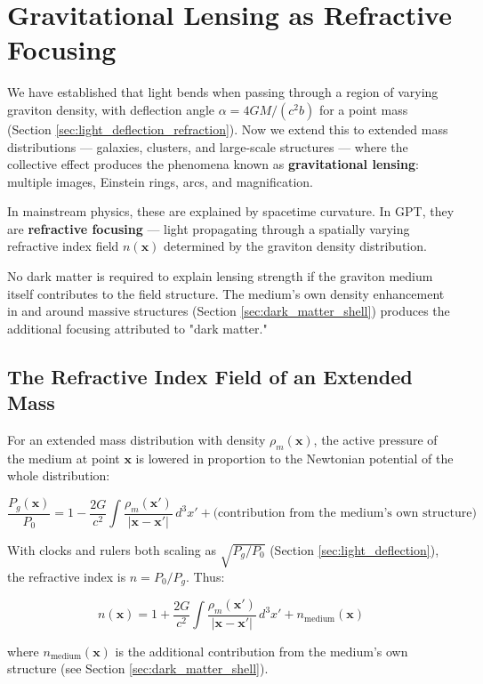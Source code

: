 \documentclass[12pt, a4paper]{article}
\begin{document}
\section{Gravitational Lensing as Refractive Focusing}
\label{sec:gravitational_lensing}

We have established that light bends when passing through a region of varying graviton density, with deflection angle \( \alpha = 4GM/(c^2 b) \) for a point mass (Section \ref{sec:light_deflection_refraction}). Now we extend this to extended mass distributions — galaxies, clusters, and large-scale structures — where the collective effect produces the phenomena known as \textbf{gravitational lensing}: multiple images, Einstein rings, arcs, and magnification.

In mainstream physics, these are explained by spacetime curvature. In GPT, they are \textbf{refractive focusing} — light propagating through a spatially varying refractive index field \( n(\mathbf{x}) \) determined by the graviton density distribution.

No dark matter is required to explain lensing strength if the graviton medium itself contributes to the field structure. The medium's own density enhancement in and around massive structures (Section \ref{sec:dark_matter_shell}) produces the additional focusing attributed to "dark matter."

\subsection{The Refractive Index Field of an Extended Mass}
\label{subsec:extended_refractive}

For an extended mass distribution with density \( \rho_m(\mathbf{x}) \), the active pressure of the medium at point \( \mathbf{x} \) is lowered in proportion to the Newtonian potential of the whole distribution:

\[
\frac{P_g(\mathbf{x})}{P_0} = 1 - \frac{2G}{c^2} \int \frac{\rho_m(\mathbf{x}')}{|\mathbf{x} - \mathbf{x}'|} \, d^3x' + \text{(contribution from the medium's own structure)}
\]

With clocks and rulers both scaling as \( \sqrt{P_g/P_0} \) (Section \ref{sec:light_deflection}), the refractive index is \( n = P_0/P_g \). Thus:

\[
n(\mathbf{x}) = 1 + \frac{2G}{c^2} \int \frac{\rho_m(\mathbf{x}')}{|\mathbf{x} - \mathbf{x}'|} \, d^3x' + n_{\text{medium}}(\mathbf{x})
\]

where \( n_{\text{medium}}(\mathbf{x}) \) is the additional contribution from the medium's own structure (see Section \ref{sec:dark_matter_shell}).
\end{document}

